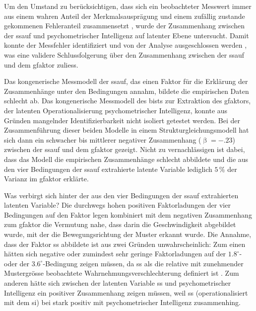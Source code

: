 \documentclass[11pt, twoside, a4paper]{book}		%
\begin{document}
Um den Umstand zu berücksichtigen, dass sich ein beobachteter Messwert immer aus einem wahren Anteil der Merkmalsausprägung und einem zufällig zustande gekommenen Fehleranteil zusammensetzt \citep{Moosbrugger2007}, wurde der Zusammenhang zwischen der \gls{ssauf} und psychometrischer Intelligenz auf latenter Ebene untersucht. Damit konnte der Messfehler identifiziert und von der Analyse ausgeschlossen werden \citep[S. 9]{Kline2011}, was eine validere Schlussfolgerung über den Zusammenhang zwischen der \gls{ssauf} und dem \gls{gfaktor} zuliess.

Das kongenerische Messmodell der \gls{ssauf}, das einen Faktor für die Erklärung der Zusammenhänge unter den Bedingungen annahm, bildete die empirischen Daten schlecht ab. Das kongenerische Messmodell des \gls{bist}s zur Extraktion des \gls{gfaktor}s, der latenten Operationalisierung psychometrischer Intelligenz, konnte aus Gründen mangelnder Identifizierbarkeit \citep[S. 125]{Kline2011} nicht isoliert getestet werden. Bei der Zusammenführung dieser beiden Modelle in einem Strukturgleichungsmodell hat sich dann ein schwacher bis mittlerer negativer Zusammenhang ($\upbeta=-.23$) zwischen der \gls{ssauf} und dem \gls{gfaktor} gezeigt. Nicht zu vernachlässigen ist dabei, dass das Modell die empirischen Zusammenhänge schlecht abbildete und die aus den vier Bedingungen der \gls{ssauf} extrahierte latente Variable lediglich $5\,\%$ der Varianz im \gls{gfaktor} erklärte.

Was verbirgt sich hinter der aus den vier Bedingungen der \gls{ssauf} extrahierten latenten Variable? Die durchwegs hohen positiven Faktorladungen der vier Bedingungen auf den Faktor legen kombiniert mit dem negativen Zusammenhang zum \gls{gfaktor} die Vermutung nahe, dass darin die Geschwindigkeit abgebildet wurde, mit der die Bewegungsrichtung der Muster erkannt wurde. Die Annahme, dass der Faktor \gls{ss} abbildete ist aus zwei Gründen unwahrscheinlich: Zum einen hätten sich negative oder zumindest sehr geringe Faktorladungen auf der $1.8^{\circ}$- oder der $3.6^{\circ}$-Bedingung zeigen müssen, da \gls{ss} als die relative mit zunehmender Mustergrösse beobachtete Wahrnehmungsverschlechterung definiert ist \citep{Melnick2013, Tadin2003, Tadin2006, Tadin2011}. Zum anderen hätte sich zwischen der latenten Variable \gls{ss} und psychometrischer Intelligenz ein positiver Zusammenhang zeigen müssen, weil \gls{ss} (operationalisiert mit dem \gls{si}) bei \citet{Melnick2013} stark positiv mit psychometrischer Intelligenz zusammenhing.


%
%
\end{document}
